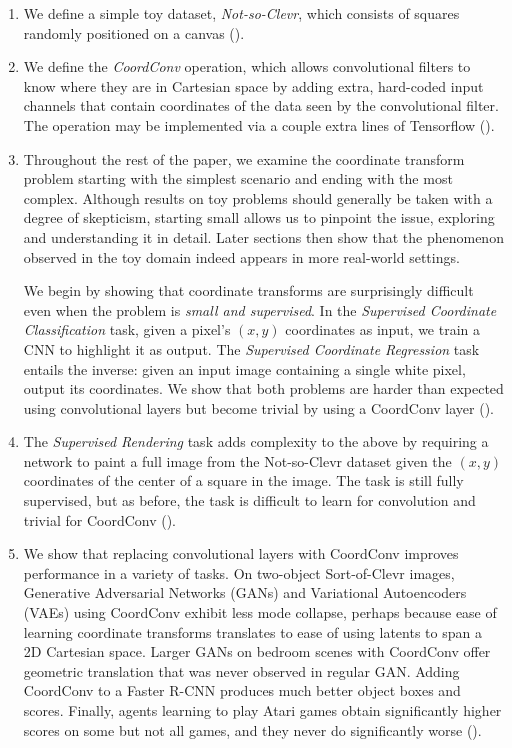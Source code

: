 \documentclass{article}
\begin{document}
\begin{enumerate}
\item We define a simple toy dataset, \emph{Not-so-Clevr}, which consists of squares randomly positioned on a canvas  ().


\item We define the \emph{CoordConv} operation, which allows convolutional filters to know where they are in Cartesian space by adding extra, hard-coded input channels that contain coordinates of the data seen by the convolutional filter. The operation may be implemented via a couple extra lines of Tensorflow ().

\item Throughout the rest of the paper, we examine the coordinate transform problem starting with the simplest scenario and ending with the most complex.
Although results on toy problems should generally be taken with a degree of skepticism, starting small allows us to pinpoint the issue, exploring and understanding it in detail.
Later sections then show that the phenomenon observed in the toy domain indeed appears in more real-world settings.


\vspace{.2em} We begin by showing that coordinate transforms are surprisingly difficult even when the problem is \emph{small and supervised}. In the \emph{Supervised Coordinate Classification} task,
given a pixel's $(x,y)$ coordinates as input, we train a CNN to highlight it as output. The \emph{Supervised Coordinate Regression} task entails the inverse:
given an input image containing a single white pixel, output its coordinates. We show that both problems are harder than expected using convolutional layers but become trivial by using a CoordConv layer ().


\item The
\emph{Supervised Rendering} task adds complexity to the above by requiring a network
  to paint a full image from the Not-so-Clevr dataset given the $(x,y)$ coordinates of the center of a square in the image.
The task is still fully supervised, but as before, the task is difficult to learn for convolution and trivial for CoordConv ().

\item
  We show that replacing convolutional layers with CoordConv improves performance in a variety of tasks.
On two-object Sort-of-Clevr \cite{sortofclevr} images, Generative Adversarial Networks (GANs) and Variational Autoencoders (VAEs) using CoordConv exhibit
  less mode collapse, perhaps because ease of learning coordinate transforms translates to ease of using latents to span a 2D Cartesian space. Larger GANs on bedroom scenes with CoordConv offer geometric translation that was never observed in regular GAN.
  Adding CoordConv to a Faster R-CNN produces much better object boxes and scores.
  Finally, agents learning to play Atari games obtain significantly higher scores on some but not all games, and they never do significantly worse
  ().


\end{enumerate}
\end{document}
